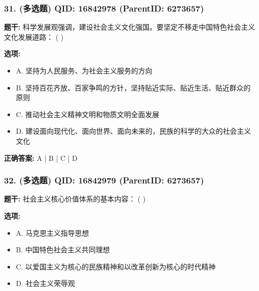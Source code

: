 \documentclass[12pt,UTF8]{ctexart}
\begin{document}
\subsubsection*{31. (多选题) \small QID: 16842978 (ParentID: 6273657)}

\textbf{题干:}
科学发展观强调，建设社会主义文化强国。要坚定不移走中国特色社会主义文化发展道路： ( )



\textbf{选项:}
\begin{itemize}[leftmargin=*]

  \item A. 坚持为人民服务、为社会主义服务的方向

  \item B. 坚持百花齐放、百家争鸣的方针，坚持贴近实际、贴近生活、贴近群众的原则

  \item C. 推动社会主义精神文明和物质文明全面发展

  \item D. 建设面向现代化、面向世界、面向未来的，民族的科学的大众的社会主义文化

\end{itemize}

\textbf{正确答案:}
A | B | C | D

\vspace{0.3em}\hrulefill\vspace{0.7em}

\subsubsection*{32. (多选题) \small QID: 16842979 (ParentID: 6273657)}

\textbf{题干:}
社会主义核心价值体系的基本内容： ( )



\textbf{选项:}
\begin{itemize}[leftmargin=*]

  \item A. 马克思主义指导思想

  \item B. 中国特色社会主义共同理想

  \item C. 以爱国主义为核心的民族精神和以改革创新为核心的时代精神

  \item D. 社会主义荣辱观

\end{itemize}
\end{document}
